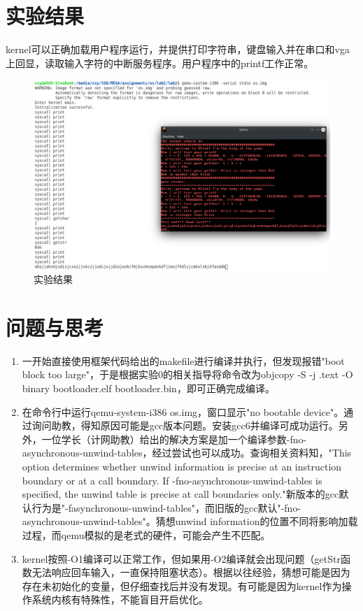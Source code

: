 \documentclass[12pt,a4paper,UTF8]{article}
\begin{document}
\section{实验结果}
kernel可以正确加载用户程序运行，并提供打印字符串，键盘输入并在串口和vga上回显，读取输入字符的中断服务程序。用户程序中的printf工作正常。
\begin{figure}[htbp]
	\centering
	\includegraphics[width=\textwidth]{result}
	\caption{实验结果}
\end{figure}


\section{问题与思考}
\begin{enumerate}
	\item 一开始直接使用框架代码给出的makefile进行编译并执行，但发现报错"boot block too large"，于是根据实验0的相关指导将命令改为objcopy -S -j .text -O binary bootloader.elf bootloader.bin，即可正确完成编译。
	\item 在命令行中运行qemu-system-i386 os.img，窗口显示"no bootable device"。通过询问助教，得知原因可能是gcc版本问题。安装gcc6并编译可成功运行。另外，一位学长（计网助教）给出的解决方案是加一个编译参数-fno-asynchronous-unwind-tables，经过尝试也可以成功。查询相关资料知，"This option determines whether unwind information is precise at an instruction boundary or at a call boundary. If -fno-asynchronous-unwind-tables is specified, the unwind table is precise at call boundaries only."新版本的gcc默认行为是"-fasynchronous-unwind-tables"，而旧版的gcc默认"-fno-asynchronous-unwind-tables"。猜想unwind information的位置不同将影响加载过程，而qemu模拟的是老式的硬件，可能会产生不匹配。
	\item kernel按照-O1编译可以正常工作，但如果用-O2编译就会出现问题（getStr函数无法响应回车输入，一直保持阻塞状态）。根据以往经验，猜想可能是因为存在未初始化的变量，但仔细查找后并没有发现。有可能是因为kernel作为操作系统内核有特殊性，不能盲目开启优化。
\end{enumerate}
\end{document}
